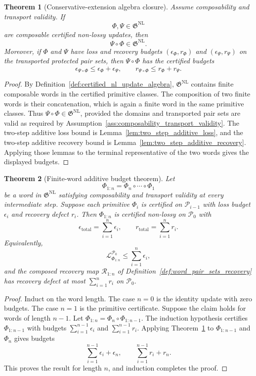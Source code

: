 \documentclass[11pt]{article}
\newtheorem{theorem}{Theorem}[section]
\newcommand{\Pcal}{\mathcal{P}}
\newcommand{\Rcal}{\mathcal{R}}
\newcommand{\Lcal}{\mathcal{L}}
\newcommand{\1}{\mathbf{1}}
\begin{document}
\begin{theorem}[Conservative-extension algebra closure]
\label{thm:conservative_extension_algebra_closure}
Assume composability and transport validity.  If
\[
\Phi,\Psi\in\mathfrak G^{\mathrm{NL}}
\]
are composable certified non-lossy updates, then
\[
\boxed{\Psi\circ\Phi\in\mathfrak G^{\mathrm{NL}}.}
\]
Moreover, if \(\Phi\) and \(\Psi\) have loss and recovery budgets \((\epsilon_\Phi,r_\Phi)\) and \((\epsilon_\Psi,r_\Psi)\) on the transported protected pair sets, then \(\Psi\circ\Phi\) has the certified budgets
\[
\epsilon_{\Psi\circ\Phi}\le\epsilon_\Phi+\epsilon_\Psi,
\qquad
r_{\Psi\circ\Phi}\le r_\Phi+r_\Psi.
\]
\end{theorem}

\begin{proof}
By Definition~\ref{def:certified_nl_update_algebra}, \(\mathfrak G^{\mathrm{NL}}\) contains finite composable words in the certified primitive classes.  The composition of two finite words is their concatenation, which is again a finite word in the same primitive classes.  Thus \(\Psi\circ\Phi\in\mathfrak G^{\mathrm{NL}}\), provided the domains and transported pair sets are valid as required by Assumption~\ref{ass:composability_transport_validity}.  The two-step additive loss bound is Lemma~\ref{lem:two_step_additive_loss}, and the two-step additive recovery bound is Lemma~\ref{lem:two_step_additive_recovery}.  Applying those lemmas to the terminal representative of the two words gives the displayed budgets.
\end{proof}

\begin{theorem}[Finite-word additive budget theorem]
\label{thm:finite_word_additive_budget}
Let
\[
\Phi_{1:n}=\Phi_n\circ\cdots\circ\Phi_1
\]
be a word in \(\mathfrak G^{\mathrm{NL}}\) satisfying composability and transport validity at every intermediate step.  Suppose each primitive \(\Phi_i\) is certified on \(\Pcal_{i-1}\) with loss budget \(\epsilon_i\) and recovery defect \(r_i\).  Then \(\Phi_{1:n}\) is certified non-lossy on \(\Pcal_0\) with
\[
\boxed{
\epsilon_{\mathrm{total}}=\sum_{i=1}^n\epsilon_i,
\qquad
r_{\mathrm{total}}=\sum_{i=1}^n r_i.
}
\]
Equivalently,
\[
\Lcal_{\Phi_{1:n}}^{\Pcal_0}\le\sum_{i=1}^n\epsilon_i,
\]
and the composed recovery map \(\Rcal_{1:n}\) of Definition~\ref{def:word_pair_sets_recovery} has recovery defect at most \(\sum_{i=1}^n r_i\) on \(\Pcal_0\).
\end{theorem}

\begin{proof}
Induct on the word length.  The case \(n=0\) is the identity update with zero budgets.  The case \(n=1\) is the primitive certificate.  Suppose the claim holds for words of length \(n-1\).  Let \(\Phi_{1:n}=\Phi_n\circ\Phi_{1:n-1}\).  The induction hypothesis certifies \(\Phi_{1:n-1}\) with budgets \(\sum_{i=1}^{n-1}\epsilon_i\) and \(\sum_{i=1}^{n-1}r_i\).  Applying Theorem~\ref{thm:conservative_extension_algebra_closure} to \(\Phi_{1:n-1}\) and \(\Phi_n\) gives budgets
\[
\sum_{i=1}^{n-1}\epsilon_i+\epsilon_n,
\qquad
\sum_{i=1}^{n-1}r_i+r_n.
\]
This proves the result for length \(n\), and induction completes the proof.
\end{proof}
\end{document}

